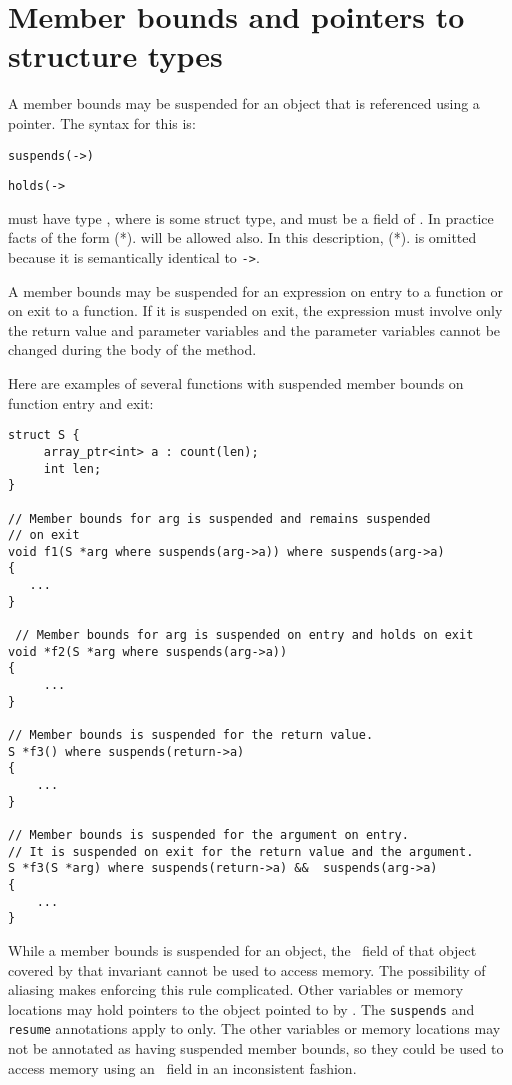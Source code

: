 
\chapter{Member bounds and pointers to structure types}\label{member-bounds-and-pointers-to-structure-types}

A member bounds may be suspended for an object that is referenced using
a pointer. The syntax for this is:


\texttt{suspends(}\texttt{-\textgreater{}}\texttt{)}

\texttt{holds(}\texttt{-\textgreater{}}

 must have type , where
 is some struct type, and  must be a field of
. In practice facts of the form (*).
will be allowed also. In this description,
(*). is omitted because it is semantically
identical to \texttt{-\textgreater{}}.

A member bounds may be suspended for an expression on entry to a
function or on exit to a function. If it is suspended on exit, the
expression must involve only the return value and parameter variables
and the parameter variables cannot be changed during the body of the
method.

Here are examples of several functions with suspended member bounds on
function entry and exit:

\begin{verbatim}
struct S {
     array_ptr<int> a : count(len);
     int len;
}

// Member bounds for arg is suspended and remains suspended
// on exit
void f1(S *arg where suspends(arg->a)) where suspends(arg->a)
{
   ...
}

 // Member bounds for arg is suspended on entry and holds on exit
void *f2(S *arg where suspends(arg->a))
{ 
     ...
}

// Member bounds is suspended for the return value.
S *f3() where suspends(return->a)
{
    ...
}

// Member bounds is suspended for the argument on entry.
// It is suspended on exit for the return value and the argument.
S *f3(S *arg) where suspends(return->a) &&  suspends(arg->a)
{
    ...
}
\end{verbatim}

While a member bounds is suspended for an object, the
\arrayptr\ field of that object covered by that invariant
cannot be used to access memory. The possibility of aliasing makes
enforcing this rule complicated. Other variables or memory locations may
hold pointers to the object pointed to by . The
\texttt{suspends} and \texttt{resume} annotations apply to 
only. The other variables or memory locations may not be annotated as
having suspended member bounds, so they could be used to access memory
using an \arrayptr\ field in an inconsistent fashion.

